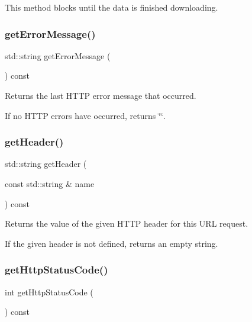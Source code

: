 This method blocks until the data is finished downloading. \mbox{\label{classGDownloader_adf0cc934eff26878cdf2018259997a4a}} 
\subsubsection{\texorpdfstring{get\+Error\+Message()}{getErrorMessage()}}
{\footnotesize\ttfamily std\+::string get\+Error\+Message (\begin{DoxyParamCaption}{ }\end{DoxyParamCaption}) const}



Returns the last H\+T\+TP error message that occurred. 

If no H\+T\+TP errors have occurred, returns \char`\"{}\char`\"{}. \mbox{\label{classGDownloader_a736d777b29179f52ba753317d84b1087}} 
\subsubsection{\texorpdfstring{get\+Header()}{getHeader()}}
{\footnotesize\ttfamily std\+::string get\+Header (\begin{DoxyParamCaption}\item[{const std\+::string \&}]{name }\end{DoxyParamCaption}) const}



Returns the value of the given H\+T\+TP header for this U\+RL request. 

If the given header is not defined, returns an empty string. \mbox{\label{classGDownloader_ab6c069ef77f1319830dcfd90eed6a2ce}} 
\subsubsection{\texorpdfstring{get\+Http\+Status\+Code()}{getHttpStatusCode()}}
{\footnotesize\ttfamily int get\+Http\+Status\+Code (\begin{DoxyParamCaption}{ }\end{DoxyParamCaption}) const}



